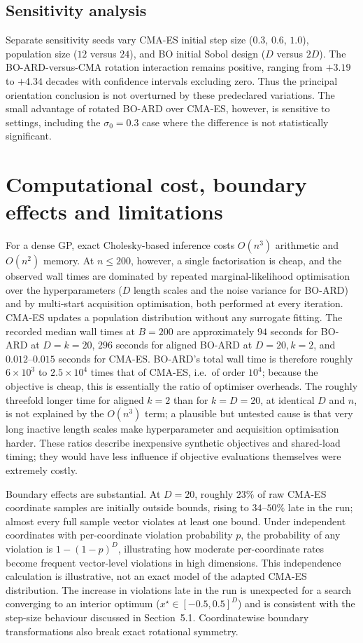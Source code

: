 \documentclass[11pt,a4paper]{article}
\begin{document}
\subsection{Sensitivity analysis}
Separate sensitivity seeds vary CMA-ES initial step size ($0.3$, $0.6$, $1.0$), population size ($12$ versus $24$), and BO initial Sobol design ($D$ versus $2D$). The BO-ARD-versus-CMA rotation interaction remains positive, ranging from $+3.19$ to $+4.34$ decades with confidence intervals excluding zero. Thus the principal orientation conclusion is not overturned by these predeclared variations. The small advantage of rotated BO-ARD over CMA-ES, however, is sensitive to settings, including the $\sigma_0=0.3$ case where the difference is not statistically significant.

\section{Computational cost, boundary effects and limitations}
For a dense GP, exact Cholesky-based inference costs $O(n^3)$ arithmetic and $O(n^2)$ memory. At $n\le200$, however, a single factorisation is cheap, and the observed wall times are dominated by repeated marginal-likelihood optimisation over the hyperparameters ($D$ length scales and the noise variance for BO-ARD) and by multi-start acquisition optimisation, both performed at every iteration. CMA-ES updates a population distribution without any surrogate fitting. The recorded median wall times at $B=200$ are approximately $94$ seconds for BO-ARD at $D=k=20$, $296$ seconds for aligned BO-ARD at $D=20,k=2$, and $0.012$--$0.015$ seconds for CMA-ES. BO-ARD's total wall time is therefore roughly $6\times10^3$ to $2.5\times10^4$ times that of CMA-ES, i.e.\ of order $10^4$; because the objective is cheap, this is essentially the ratio of optimiser overheads. The roughly threefold longer time for aligned $k=2$ than for $k=D=20$, at identical $D$ and $n$, is not explained by the $O(n^3)$ term; a plausible but untested cause is that very long inactive length scales make hyperparameter and acquisition optimisation harder. These ratios describe inexpensive synthetic objectives and shared-load timing; they would have less influence if objective evaluations themselves were extremely costly.

Boundary effects are substantial. At $D=20$, roughly $23\%$ of raw CMA-ES coordinate samples are initially outside bounds, rising to $34$--$50\%$ late in the run; almost every full sample vector violates at least one bound. Under independent coordinates with per-coordinate violation probability $p$, the probability of any violation is $1-(1-p)^D$, illustrating how moderate per-coordinate rates become frequent vector-level violations in high dimensions. This independence calculation is illustrative, not an exact model of the adapted CMA-ES distribution. The increase in violations late in the run is unexpected for a search converging to an interior optimum ($x^\star\in[-0.5,0.5]^D$) and is consistent with the step-size behaviour discussed in Section~5.1. Coordinatewise boundary transformations also break exact rotational symmetry. %
\end{document}
